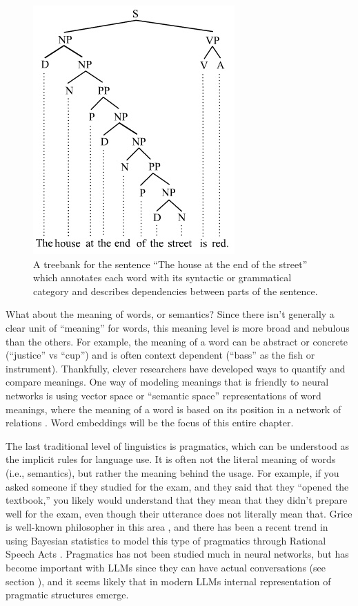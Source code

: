\begin{figure}[h]
\centering
\includegraphics[scale=.45]{./images/treeBank.jpg}
\caption[From \url{https://commons.wikimedia.org/wiki/File:The_house_at_the_end_of_the_street.jpg}]{A treebank for the sentence ``The house at the end of the street'' which annotates each word with its syntactic or grammatical category and describes dependencies between parts of the sentence.}
\label{treeBank}
\end{figure}

What about the meaning of words, or semantics? Since there isn't generally a clear unit of ``meaning'' for words, this meaning level is more broad and nebulous than the others. For example, the meaning of a word can be abstract or concrete (``justice'' vs ``cup'') and is often context dependent (``bass'' as the fish or instrument). Thankfully, clever researchers have developed ways to quantify and compare meanings. One way of modeling meanings that is friendly to neural networks is using vector space or ``semantic space'' representations of word meanings, where the meaning of a word is based on its position in a network of relations \cite{erk2012vector}. Word embeddings will be the focus of this entire chapter.

The last traditional level of linguistics is pragmatics, which can be understood as the implicit rules for language use. It is often not the literal meaning of words (i.e., semantics), but rather the meaning behind the usage. For example, if you asked someone if they studied for the exam, and they said that they ``opened the textbook,'' you likely would understand that they mean that they didn't prepare well for the exam, even though their utterance does not literally mean that. Grice is well-known philosopher in this area \cite{grice1957meaning, grice1975logic}, and there has been a recent trend in using Bayesian statistics to model this type of pragmatics through Rational Speech Acts \cite{goodman2016pragmatic}. Pragmatics has not been studied much in neural networks, but has become important with LLMs since they can have actual conversations (see section ), and it seems likely that in modern LLMs internal representation of pragmatic structures emerge.

